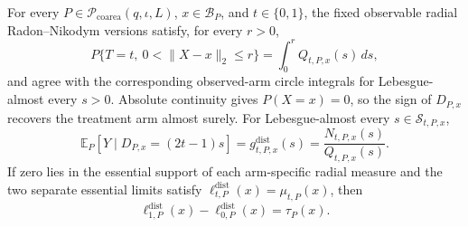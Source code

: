 For every \(P\in\mathcal P_{\mathrm{coarea}}(q,\iota,L)\), \(x\in\mathcal B_P\), and \(t\in\{0,1\}\), the fixed observable radial Radon--Nikodym versions satisfy, for every \(r>0\),
\[
 P\{T=t,\ 0<\lVert X-x\rVert_2\leq r\}
 =\int_0^rQ_{t,P,x}(s)\,ds,
\]
and agree with the corresponding observed-arm circle integrals for Lebesgue-almost every \(s>0\).  Absolute continuity gives \(P(X=x)=0\), so the sign of \(D_{P,x}\) recovers the treatment arm almost surely.  For Lebesgue-almost every \(s\in\mathcal S_{t,P,x}\),
\[
 \mathbb E_P[Y\mid D_{P,x}=(2t-1)s]
 =g^{\mathrm{dist}}_{t,P,x}(s)
 =\frac{N_{t,P,x}(s)}{Q_{t,P,x}(s)}.
\]
If zero lies in the essential support of each arm-specific radial measure and the two separate essential limits satisfy \(\ell^{\mathrm{dist}}_{t,P}(x)=\mu_{t,P}(x)\), then
\[
 \ell^{\mathrm{dist}}_{1,P}(x)-\ell^{\mathrm{dist}}_{0,P}(x)
 =\tau_P(x).
\]
